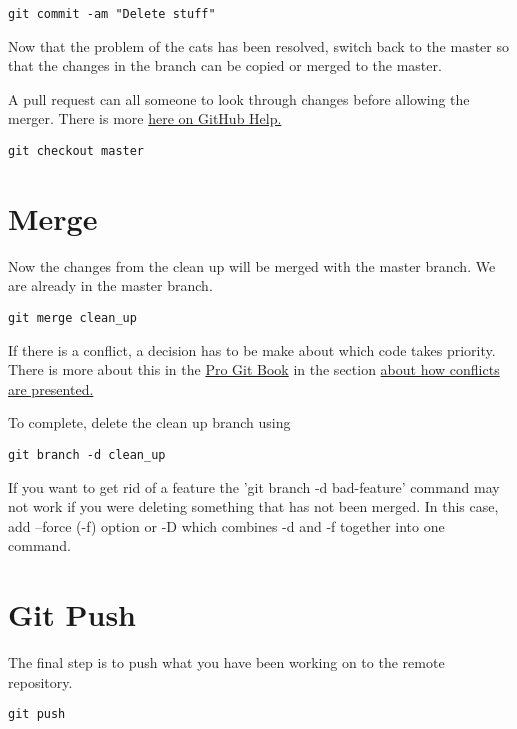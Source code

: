 \documentclass[11pt]{article} %
\begin{document}
\begin{lstlisting}
git commit -am "Delete stuff"  
\end{lstlisting}

Now that the problem of the cats has been resolved, switch back to the master so that the changes in the branch can be copied or merged to the master. 

A pull request can all someone to look through changes before allowing the merger.  There is more \href{https://help.github.com/articles/using-pull-requests}{here on GitHub Help.}

\begin{lstlisting}
git checkout master  
\end{lstlisting}

\section{Merge}
Now the changes from the clean up will be merged with the master branch.  We are already in the master branch.  

\begin{lstlisting}
git merge clean_up  
\end{lstlisting}

If there is a conflict, a decision has to be make about which code takes priority.  There is more about this in the \href{http://git-scm.com/book}{Pro Git Book} in the section \href{http://git-scm.com/docs/git-merge#_how_conflicts_are_presented}{about how conflicts are presented.}

To complete, delete the clean up branch using 

\begin{lstlisting}
git branch -d clean_up 
\end{lstlisting}

If you want to get rid of a feature the 'git branch -d bad-feature' command may not work if you were deleting something that has not been merged.  In this case, add --force (-f) option or -D which combines -d and -f together into one command. 

\section{Git Push}
The final step is to push what you have been working on to the remote repository.  
\begin{lstlisting}
git push  
\end{lstlisting}
 
\end{document}
